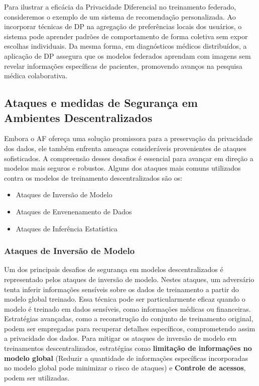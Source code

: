 Para ilustrar a eficácia da Privacidade Diferencial no treinamento federado, consideremos o exemplo de um sistema de recomendação personalizada. Ao incorporar técnicas de DP na agregação de preferências locais dos usuários, o sistema pode aprender padrões de comportamento de forma coletiva sem expor escolhas individuais. Da mesma forma, em diagnósticos médicos distribuídos, a aplicação de DP assegura que os modelos federados aprendam com imagens sem revelar informações específicas de pacientes, promovendo avanços na pesquisa médica colaborativa\cite{shokri2015}.



\subsection{Ataques e medidas de Segurança em Ambientes Descentralizados}

Embora o AF ofereça uma solução promissora para a preservação da privacidade dos dados, ele também enfrenta ameaças consideráveis provenientes de ataques sofisticados. A compreensão desses desafios é essencial para avançar em direção a modelos mais seguros e robustos\cite{geyer2017differentially}. Alguns dos ataques mais comuns utilizados contra os modelos de treinamento descentralizados são os:

\begin{itemize}
    \item Ataques de Inversão de Modelo
    \item Ataques de Envenenamento de Dados
    \item Ataques de Inferência Estatística
\end{itemize}

\subsubsection{Ataques de Inversão de Modelo}

Um dos principais desafios de segurança em modelos descentralizados é representado pelos ataques de inversão de modelo. Nestes ataques, um adversário tenta inferir informações sensíveis sobre os dados de treinamento a partir do modelo global treinado. Essa técnica pode ser particularmente eficaz quando o modelo é treinado em dados sensíveis, como informações médicas ou financeiras. Estratégias avançadas, como a reconstrução do conjunto de treinamento original, podem ser empregadas para recuperar detalhes específicos, comprometendo assim a privacidade dos dados\cite{fredrikson2014privacy}. Para mitigar os ataques de inversão de modelo em treinamentos descentralizados, estratégias como \textbf{limitação de informações no modelo global} (Reduzir a quantidade de informações específicas incorporadas no modelo global pode minimizar o risco de ataques) e \textbf{Controle de acessos}, podem ser utilizadas.

